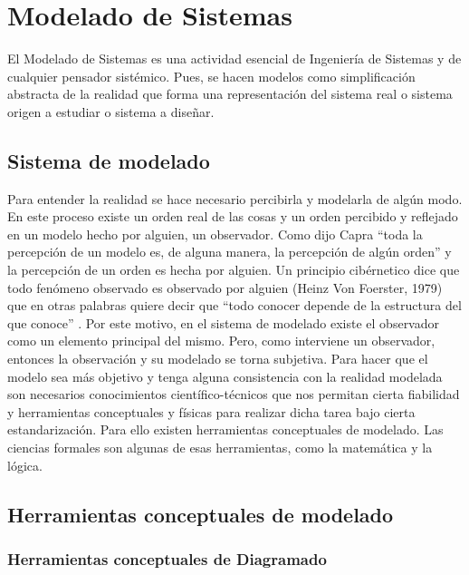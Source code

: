 
\chapter{Modelado de Sistemas}

El Modelado de Sistemas es una actividad esencial de Ingeniería de Sistemas y de cualquier pensador sistémico. Pues, se hacen modelos como simplificación abstracta de la realidad \cite{Meadows-2009} que forma una representación del sistema real \cite{Fiuba-2005} o sistema origen a estudiar o sistema a diseñar.

\section{Sistema de modelado}

Para entender la realidad se hace necesario percibirla y modelarla de algún modo. En este proceso existe un orden real de las cosas y un orden percibido y reflejado en un modelo hecho por alguien, un observador. Como dijo Capra “toda la percepción de un modelo es, de alguna manera, la percepción de algún orden” \cite{Fritjof-Capra-1975} y la percepción de un orden es hecha por alguien. Un principio cibérnetico dice que todo fenómeno observado es observado por alguien (Heinz Von Foerster, 1979) que en otras palabras quiere decir que “todo conocer depende de la estructura del que conoce” \cite{Maturana-1984}. Por este motivo, en el sistema de modelado existe el observador como un elemento principal del mismo. Pero, como interviene un observador, entonces la observación y su modelado se torna subjetiva. Para hacer que el modelo sea más objetivo y tenga alguna consistencia con la realidad modelada son necesarios conocimientos científico-técnicos que nos permitan cierta fiabilidad y herramientas conceptuales y físicas para realizar dicha tarea bajo cierta estandarización. Para ello existen herramientas conceptuales de modelado. Las ciencias formales son algunas de esas herramientas, como la matemática y la lógica.

\section{Herramientas conceptuales de modelado}

\subsection{Herramientas conceptuales de Diagramado}


